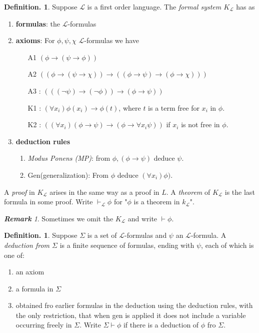 \documentclass[a4paper,oneside,11pt,DIV=12,parskip=half]{scrartcl}
\newcommand{\LL}{\mathcal L}
\theoremstyle{plain}
\theoremstyle{definition}
\newtheorem{definition}[theorem]{Definition.}
\newtheorem{remark, definition}[theorem]{Remark and Definition.}
\newtheorem{lemma, definition}[theorem]{Lemma and Definition.}
\newtheorem{theorem, definition}[theorem]{Theorem and Definition.}
\theoremstyle{remark}
\newtheorem*{remark}{\textbf{Remark}}
\newtheorem*{remark, example}{\textbf{Remark and Exercise}}
\begin{document}
\begin{definition}
 Suppose $\LL$ is a first order language. The \emph{formal system $K_\LL$} has as
 \begin{enumerate}
     \item \textbf{formulas}: the $\LL$-formulas
     \item \textbf{axioms}: For $\phi,\psi,\chi$ $\LL$-formulas we have \begin{itemize}
          \item[A1] $(\phi \rightarrow (\psi \rightarrow \phi))$
        \item[A2] $((\phi \rightarrow (\psi \rightarrow \chi)) \rightarrow ((\phi \rightarrow \psi) \rightarrow (\phi \rightarrow \chi)))$
        \item[A3]: $(((\lnot \psi) \rightarrow ( \lnot \phi)) \rightarrow (\phi \rightarrow \psi))$
        \item[K1]: $(\forall x_i) \phi(x_i) \rightarrow \phi(t)$, where $t$ is a term free for $x_i$ in $\phi$.
        \item[K2]: $((\forall x_i)(\phi \rightarrow \psi) \rightarrow (\phi \rightarrow \forall x_i \psi))$ if $x_i$ is not free in $\phi$. 
     \end{itemize}
     
     \item \textbf{deduction rules}
        \begin{enumerate}
            \item \emph{ Modus Ponens (MP)}: from $\phi,  (\phi \rightarrow \psi)$ deduce $\psi$.
            \item Gen(generalization): From $\phi$ deduce $(\forall x_i)\phi)$.
        \end{enumerate}
     
 \end{enumerate}
 
 A \emph{proof} in $K_\LL$ arises in the same way as a proof in $L$.
 A \emph{theorem} of $K_\LL$ is the last formula in some proof.
 Write $\vdash_\LL \phi$ for "$\phi$ is a theorem in $k_\LL$".
 
\end{definition}

\begin{remark}
Sometimes we omit the $K_\LL$ and write $\vdash \phi$.
\end{remark}

\begin{definition}
 Suppose $\Sigma$ is a set of $\LL$-formulas and $\psi$ an $\LL$-formula. A \emph{deduction from $\Sigma$} is a finite sequence of formulas, ending with $\psi$, each of which is one of:
 \begin{enumerate}
     \item an axiom
     \item a formula in $\Sigma$
     \item obtained fro earlier formulas in the deduction using the deduction rules, with the only restriction, that when gen is applied it does not include a variable occurring freely in $\Sigma$.
     Write $\Sigma \vdash \phi$ if there is a deduction of $\phi$ fro $\Sigma$.
 \end{enumerate}
\end{definition}
\end{document}
